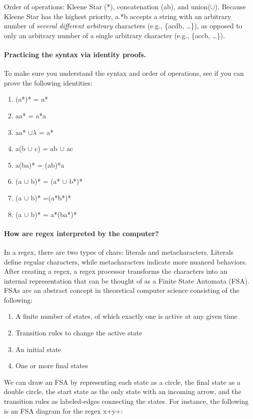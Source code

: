 \documentclass{pset_template}
\begin{document}
Order of operations: Kleene Star (*), concatenation (ab), and union($\cup$).
Because Kleene Star has the highest priority, a.*b accepts a string
with an arbitrary number of \textit{several different arbitrary} characters
 (e.g., \{acdb, \ldots\}), as opposed
to only an arbitrary number of a single arbitrary character (e.g., \{accb, \ldots\}).

\paragraph{Practicing the syntax via identity proofs.}
To make sure you understand the syntax and order of operations,
see if you can prove the following identities:
\begin{enumerate}
\item (a*)* = a*
\item aa* = a*a
\item aa* $\cup \lambda$ = a*
\item a(b $\cup$ c) = ab $\cup$ ac
\item a(ba)* = (ab)*a
\item (a $\cup$ b)* = (a* $\cup$ b*)*
\item (a $\cup$ b)* =(a*b*)*
\item (a $\cup$ b)* = a*(ba*)*
\end{enumerate}

\paragraph{How are regex interpreted by the computer?}
In a regex, there are two types of chars: literals and metacharacters.
Literals define regular characters, while metacharacters indicate
more nuanced behaviors.
After creating a regex, a regex processor transforms the characters into an internal
representation that can be thought of as a Finite State Automata (FSA).
FSAs are an abstract concept in theoretical computer science consisting of the following:
\begin{enumerate}
\item A finite number of states, of which exactly one is active at any given time
\item Transition rules to change the active state
\item An initial state
\item One or more final states
\end{enumerate}
We can draw an FSA by representing each state as a circle, the final state
as a double circle, the start state as the only state with an incoming arrow,
and the transition rules as labeled-edges connecting the states.
For instance, the following is an FSA diagram for the regex x+y+:
\end{document}
